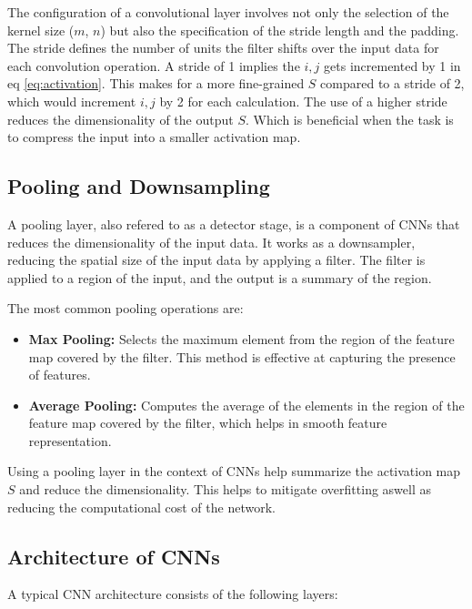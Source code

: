 The configuration of a convolutional layer involves not only the selection of the kernel size ($m$, $n$) but also the specification of the stride length and the padding. 
The stride defines the number of units the filter shifts over the input data for each convolution operation. A stride of 1 implies the $i,j$ gets incremented by 1 in eq \ref{eq:activation}.
This makes for a more fine-grained $S$ compared to a stride of 2, which would increment $i,j$ by 2 for each calculation. The use of a higher stride reduces the dimensionality of the output $S$.
Which is beneficial when the task is to compress the input into a smaller activation map.

\subsection{Pooling and Downsampling}
A pooling layer, also refered to as a detector stage, is a component of CNNs that reduces the dimensionality of the input data.
It works as a downsampler, reducing the spatial size of the input data by applying a filter. The filter is applied to a region of the input, and the output is a summary of the region.

The most common pooling operations are:
\begin{itemize}
    \item \textbf{Max Pooling:} Selects the maximum element from the region of the feature map covered by the filter. This method is effective at capturing the presence of features.
    \item \textbf{Average Pooling:} Computes the average of the elements in the region of the feature map covered by the filter, which helps in smooth feature representation.
\end{itemize}



Using a pooling layer in the context of CNNs help summarize the activation map $S$ and reduce the dimensionality. This helps to mitigate overfitting aswell as reducing the computational cost of the network.

\subsection{Architecture of CNNs}
A typical CNN architecture consists of the following layers:

